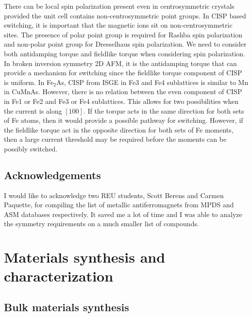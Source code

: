 \documentclass[10pt,doublespacing,edeposit]{uiucthesis2020}
\begin{document}
\begin{mainmatter}
There can be local spin polarization present even in centrosymmetric crystals provided the unit cell contains non-centrosymmetric point groups. In CISP based switching, it is important that the magnetic ions sit on non-centrosymmetric sites. The presence of polar point group is required for Rashba spin polarization and non-polar point group for Dresselhaus spin polarization. We need to consider both antidamping torque and fieldlike torque when considering spin polarization. In broken inversion symmetry 2D AFM, it is the antidamping torque that can provide a mechanism for switching since the fieldlike torque component of CISP is uniform. In Fe$_2$As, CISP from ISGE in Fe3 and Fe4 sublattices is similar to Mn in CuMnAs. However, there is no relation between the even component of CISP in Fe1 or Fe2 and Fe3 or Fe4 sublattices. This allows for two possibilities when the current is along $[100]$. If the torque acts in the same direction for both sets of Fe atoms, then it would provide a possible pathway for switching. However, if the fieldlike torque act in the opposite direction for both sets of Fe moments, then a large current threshold may be required before the moments can be possibly switched.

\section{Acknowledgements}


I would like to acknowledge two REU students, Scott Berens and Carmen Paquette, for compiling the list of metallic antiferromagnets from MPDS and ASM databases respectively. It saved me a lot of time and I was able to analyze the symmetry requirements on a much smaller list of compounds.





\chapter{Materials synthesis and characterization}

\section{Bulk materials synthesis}



\end{mainmatter}
\end{document}
